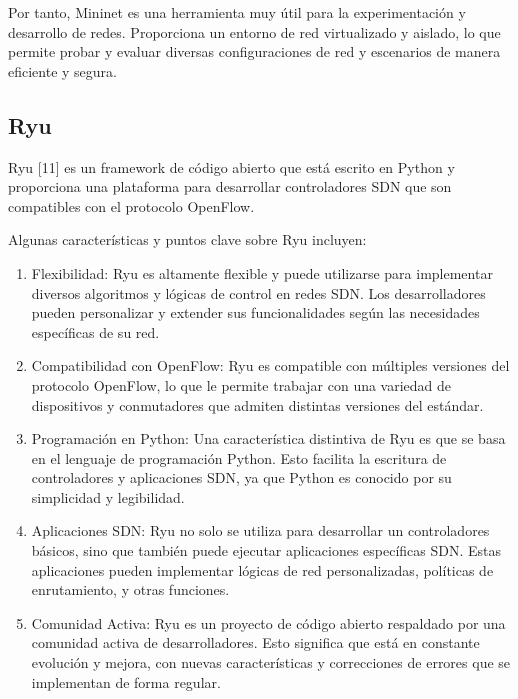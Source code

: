 \documentclass[a4paper, 12pt]{book}
\begin{document}
	
	Por tanto, Mininet es una herramienta muy útil para la experimentación y desarrollo de redes. Proporciona un entorno de red virtualizado y aislado, lo que permite probar y evaluar diversas configuraciones de red y escenarios de manera eficiente y segura.
		
	
	
	\subsection{Ryu} 
	\label{sec:ryu}
	
	
	Ryu [11] es un framework de código abierto que está escrito en Python y proporciona una plataforma para desarrollar controladores SDN que son compatibles con el protocolo OpenFlow.
	
	Algunas características y puntos clave sobre Ryu incluyen:
	
	\begin{enumerate}
		
		\item Flexibilidad: Ryu es altamente flexible y puede utilizarse para implementar diversos algoritmos y lógicas de control en redes SDN. Los desarrolladores pueden personalizar y extender sus funcionalidades según las necesidades específicas de su red.
		
		\item Compatibilidad con OpenFlow: Ryu es compatible con múltiples versiones del protocolo OpenFlow, lo que le permite trabajar con una variedad de dispositivos y conmutadores que admiten distintas versiones del estándar.
		
		\item Programación en Python: Una característica distintiva de Ryu es que se basa en el lenguaje de programación Python. Esto facilita la escritura de controladores y aplicaciones SDN, ya que Python es conocido por su simplicidad y legibilidad.
		
		\item Aplicaciones SDN: Ryu no solo se utiliza para desarrollar un controladores básicos, sino que también puede ejecutar aplicaciones específicas SDN. Estas aplicaciones pueden implementar lógicas de red personalizadas, políticas de enrutamiento, y otras funciones.
		
		\item Comunidad Activa: Ryu es un proyecto de código abierto respaldado por una comunidad activa de desarrolladores. Esto significa que está en constante evolución y mejora, con nuevas características y correcciones de errores que se implementan de forma regular.
		
	\end{enumerate}
	
\end{document}
